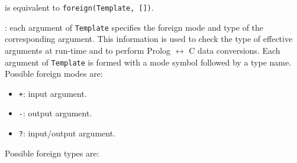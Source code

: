  is equivalent to
\texttt{foreign(Template, [])}.

: each argument of \texttt{Template}
specifies the foreign mode and type of the corresponding argument. This
information is used to check the type of effective arguments at run-time and
to perform Prolog $\leftrightarrow$ C data conversions. Each argument of
\texttt{Template} is formed with a mode symbol followed by a type name.
Possible foreign modes are:

\begin{itemize}

\item \texttt{+}: input argument.

\item \texttt{-}: output argument.

\item \texttt{?}: input/output argument.

\end{itemize}

Possible foreign types are:

